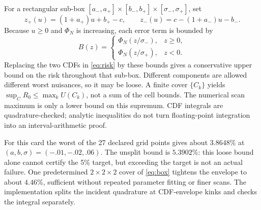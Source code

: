 \documentclass[11pt,a4paper]{article}
\begin{document}
For a rectangular sub-box $[a_-,a_+]\times[b_-,b_+]\times
[\sigma_-,\sigma_+]$, set
\begin{equation}
 z_+(u)=(1+a_+)u+b_+-c,\qquad
 z_-(u)=c-(1+a_-)u-b_- .
\end{equation}
Because $u\geq0$ and $\Phi_{\!N}$ is increasing, each error term is
bounded by
\begin{equation}
 B(z)=
 \begin{cases}
 \Phi_{\!N}(z/\sigma_-),&z\geq0,\\
 \Phi_{\!N}(z/\sigma_+),&z<0 .
 \end{cases}
\end{equation}
Replacing the two CDFs in \eqref{eq:risk} by these bounds gives a
conservative upper bound on the risk throughout that sub-box.
Different components are allowed different worst nuisances, so it
may be loose. A finite cover $\{C_k\}$ yields
$\sup_C R_0\leq\max_k U(C_k)$, not a sum of the cell bounds.
The numerical scan maximum is only a lower bound on this supremum.
CDF integrals are quadrature-checked; analytic inequalities do not
turn floating-point integration into an interval-arithmetic proof.

For this card the worst of the 27 declared grid points gives about
$3.8648\%$ at $(a,b,\sigma)=(-.01,-.02,.06)$. The unsplit bound is
$5.3902\%$: this loose bound alone cannot certify the 5\% target,
but exceeding the target is not an actual failure. One predetermined
$2\times2\times2$ cover of \eqref{eq:box} tightens the envelope to
about $4.46\%$, sufficient without repeated parameter fitting or
finer scans. The implementation splits the incident quadrature at
CDF-envelope kinks and checks the integral separately.
\end{document}
